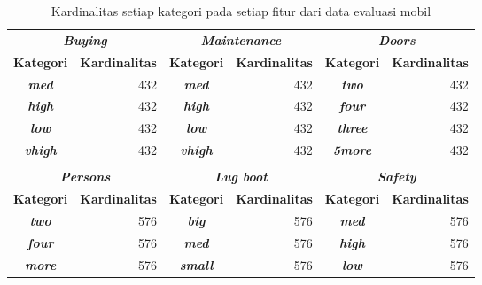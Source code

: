 \begin{table}[htbp!]
  \centering
  \caption{Kardinalitas setiap kategori pada setiap fitur dari data evaluasi mobil}
    \begin{tabular}{crcrcr}
    \toprule
    \multicolumn{2}{c}{\textit{\textbf{Buying}}} & \multicolumn{2}{c}{\textit{\textbf{Maintenance}}} & \multicolumn{2}{c}{\textit{\textbf{Doors}}} \\
    \cmidrule(r){1-2}\cmidrule(lr){3-4}\cmidrule(l){5-6}
    \textbf{Kategori} & \multicolumn{1}{c}{\textbf{Kardinalitas}} & \textbf{Kategori} & \multicolumn{1}{c}{\textbf{Kardinalitas}} & \textbf{Kategori} & \multicolumn{1}{c}{\textbf{Kardinalitas}} \\
    \cmidrule(r){1-2}\cmidrule(lr){3-4}\cmidrule(l){5-6}
    \textit{\textbf{med}} & 432   & \textit{\textbf{med}} & 432   & \textit{\textbf{two}} & 432 \\
    \textit{\textbf{high}} & 432   & \textit{\textbf{high}} & 432   & \textit{\textbf{four}} & 432 \\
    \textit{\textbf{low}} & 432   & \textit{\textbf{low}} & 432   & \textit{\textbf{three}} & 432 \\
    \textit{\textbf{vhigh}} & 432   & \textit{\textbf{vhigh}} & 432   & \textit{\textbf{5more}} & 432 \\
    \midrule
          &       &       &       &       &  \\
    \midrule
    \multicolumn{2}{c}{\textit{\textbf{Persons}}} & \multicolumn{2}{c}{\textit{\textbf{Lug boot}}} & \multicolumn{2}{c}{\textit{\textbf{Safety}}} \\
    \cmidrule(r){1-2}\cmidrule(lr){3-4}\cmidrule(l){5-6}
    \textbf{Kategori} & \multicolumn{1}{c}{\textbf{Kardinalitas}} & \textbf{Kategori} & \multicolumn{1}{c}{\textbf{Kardinalitas}} & \textbf{Kategori} & \multicolumn{1}{c|}{\textbf{Kardinalitas}} \\
    \cmidrule(r){1-2}\cmidrule(lr){3-4}\cmidrule(l){5-6}
    \textit{\textbf{two}} & 576   & \textit{\textbf{big}} & 576   & \textit{\textbf{med}} & 576 \\
    \textit{\textbf{four}} & 576   & \textit{\textbf{med}} & 576   & \textit{\textbf{high}} & 576 \\
    \textit{\textbf{more}} & 576   & \textit{\textbf{small}} & 576   & \textit{\textbf{low}} & 576 \\
    \bottomrule
    \end{tabular}%
  \label{tab: kard kat ev mobil}%
\end{table}%

